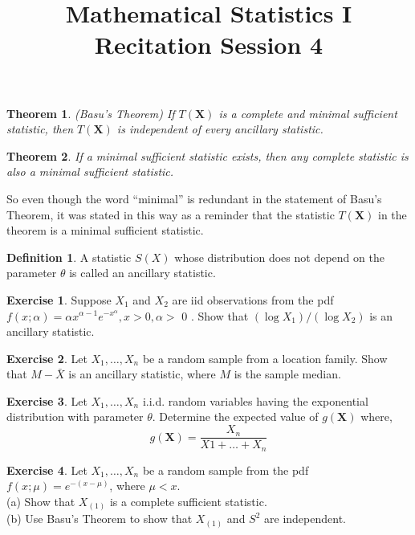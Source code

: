 \documentclass{article}
\title{Mathematical Statistics I\\ Recitation Session 4}
\date{}
\newtheorem*{theorem*}{Theorem}
\theoremstyle{definition}
\newtheorem*{definition*}{Definition}
\newtheorem*{exercise*}{Exercise}
\begin{document}
	\maketitle
	\begin{theorem*}
		(Basu’s Theorem) If $T(\mathbf{X})$ is a complete and minimal sufficient statistic, then $T(\mathbf{X})$ is independent of every ancillary statistic.
	\end{theorem*}
	
	\begin{theorem*}
		If a minimal sufficient statistic exists, then any complete statistic is also a minimal sufficient statistic.
	\end{theorem*}
		So even though the word “minimal” is redundant in the statement of Basu’s Theorem, it was stated in this way as a reminder that the statistic $T(\mathbf{X})$ in the theorem is a minimal sufficient statistic.
		
	\begin{definition*}
		A statistic $S(X)$ whose distribution does not depend on the parameter $\theta$ is called an ancillary statistic.
	\end{definition*}
	
	\begin{exercise*}
		Suppose $X_1$ and $X_2$ are iid observations from the pdf $f(x;\alpha)=\alpha x^{\alpha-1} e^{-x^\alpha}, x>0, \alpha>$ 0 . Show that $\left(\log X_1\right) /\left(\log X_2\right)$ is an ancillary statistic.
	\end{exercise*}
	 
	\begin{exercise*}
		Let $X_1, \ldots, X_n$ be a random sample from a location family. Show that $M-\bar{X}$ is an ancillary statistic, where $M$ is the sample median.
	\end{exercise*}
	
	\begin{exercise*}
		Let $X_1,\dots,X_n$ i.i.d. random variables having the exponential distribution with parameter $\theta$. Determine the expected value of $g(\mathbf{X})$ where,
		$$
		g(\mathbf{X}) = \frac{X_n}{X1 + \dots + X_n}
		$$
	\end{exercise*}
	
	\begin{exercise*}
		Let $X_1, \ldots, X_n$ be a random sample from the pdf $f(x;\mu)=e^{-(x-\mu)}$, where $\mu<x$.\\
		(a) Show that $X_{(1)}$ is a complete sufficient statistic.\\
		(b) Use Basu's Theorem to show that $X_{(1)}$ and $S^2$ are independent.
	\end{exercise*}
	
\end{document}
